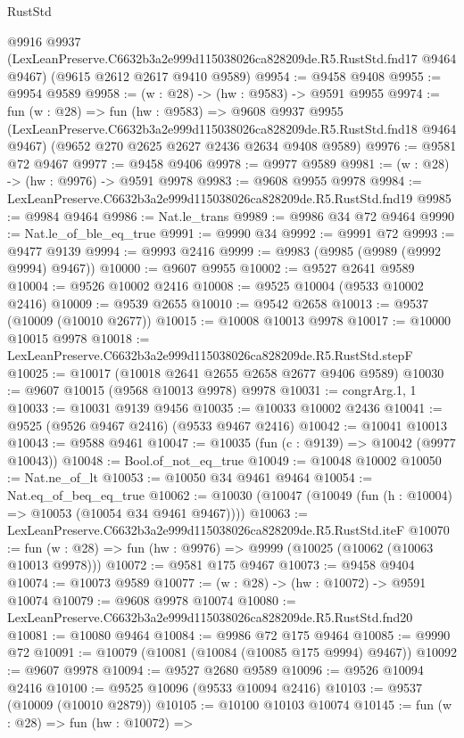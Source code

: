 \begin{lexlean}{RustStd}
\begin{coremodule}
    @9916
    @9937
    (LexLeanPreserve.C6632b3a2e999d115038026ca828209de.R5.RustStd.fnd17 @9464 @9467)
    (@9615 @2612 @2617 @9410 @9589)
@9954 := @9458 @9408
@9955 := @9954 @9589
@9958 := (w : @28) -> (hw : @9583) -> @9591 @9955
@9974 := fun (w : @28) =>
  fun (hw : @9583) =>
  @9608
    @9937
    @9955
    (LexLeanPreserve.C6632b3a2e999d115038026ca828209de.R5.RustStd.fnd18 @9464 @9467)
    (@9652 @270 @2625 @2627 @2436 @2634 @9408 @9589)
@9976 := @9581 @72 @9467
@9977 := @9458 @9406
@9978 := @9977 @9589
@9981 := (w : @28) -> (hw : @9976) -> @9591 @9978
@9983 := @9608 @9955 @9978
@9984 := LexLeanPreserve.C6632b3a2e999d115038026ca828209de.R5.RustStd.fnd19
@9985 := @9984 @9464
@9986 := Nat.le_trans
@9989 := @9986 @34 @72 @9464
@9990 := Nat.le_of_ble_eq_true
@9991 := @9990 @34
@9992 := @9991 @72
@9993 := @9477 @9139
@9994 := @9993 @2416
@9999 := @9983 (@9985 (@9989 (@9992 @9994) @9467))
@10000 := @9607 @9955
@10002 := @9527 @2641 @9589
@10004 := @9526 @10002 @2416
@10008 := @9525 @10004 (@9533 @10002 @2416)
@10009 := @9539 @2655
@10010 := @9542 @2658
@10013 := @9537 (@10009 (@10010 @2677))
@10015 := @10008 @10013 @9978
@10017 := @10000 @10015 @9978
@10018 := LexLeanPreserve.C6632b3a2e999d115038026ca828209de.R5.RustStd.stepF
@10025 := @10017 (@10018 @2641 @2655 @2658 @2677 @9406 @9589)
@10030 := @9607 @10015 (@9568 @10013 @9978) @9978
@10031 := congrArg.{1, 1}
@10033 := @10031 @9139 @9456
@10035 := @10033 @10002 @2436
@10041 := @9525 (@9526 @9467 @2416) (@9533 @9467 @2416)
@10042 := @10041 @10013
@10043 := @9588 @9461
@10047 := @10035 (fun (c : @9139) => @10042 (@9977 @10043))
@10048 := Bool.of_not_eq_true
@10049 := @10048 @10002
@10050 := Nat.ne_of_lt
@10053 := @10050 @34 @9461 @9464
@10054 := Nat.eq_of_beq_eq_true
@10062 := @10030 (@10047 (@10049 (fun (h : @10004) => @10053 (@10054 @34 @9461 @9467))))
@10063 := LexLeanPreserve.C6632b3a2e999d115038026ca828209de.R5.RustStd.iteF
@10070 := fun (w : @28) => fun (hw : @9976) => @9999 (@10025 (@10062 (@10063 @10013 @9978)))
@10072 := @9581 @175 @9467
@10073 := @9458 @9404
@10074 := @10073 @9589
@10077 := (w : @28) -> (hw : @10072) -> @9591 @10074
@10079 := @9608 @9978 @10074
@10080 := LexLeanPreserve.C6632b3a2e999d115038026ca828209de.R5.RustStd.fnd20
@10081 := @10080 @9464
@10084 := @9986 @72 @175 @9464
@10085 := @9990 @72
@10091 := @10079 (@10081 (@10084 (@10085 @175 @9994) @9467))
@10092 := @9607 @9978
@10094 := @9527 @2680 @9589
@10096 := @9526 @10094 @2416
@10100 := @9525 @10096 (@9533 @10094 @2416)
@10103 := @9537 (@10009 (@10010 @2879))
@10105 := @10100 @10103 @10074
@10145 := fun (w : @28) =>
  fun (hw : @10072) =>

\end{coremodule}
\end{lexlean}
